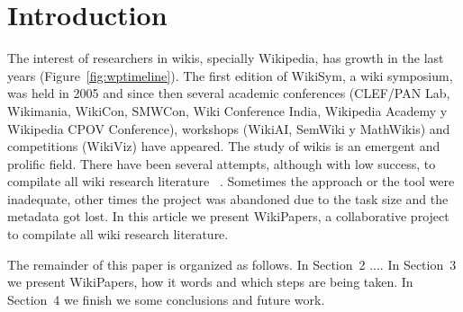 \documentclass[11pt,twocolumn]{article}
\begin{document}
\section{Introduction}

The interest of researchers in wikis, specially Wikipedia, has growth in the last years (Figure~\ref{fig:wptimeline}). The first edition of WikiSym, a wiki symposium, was held in 2005 and since then several academic conferences (CLEF/PAN Lab, Wikimania, WikiCon, SMWCon, Wiki Conference India, Wikipedia Academy y Wikipedia CPOV Conference), workshops (WikiAI, SemWiki y MathWikis) and competitions (WikiViz) have appeared. The study of wikis is an emergent and prolific field. There have been several attempts, although with low success, to compilate all wiki research literature ~\citep{ayers2011}. Sometimes the approach or the tool were inadequate, other times the project was abandoned due to the task size and the metadata got lost. In this article we present WikiPapers, a collaborative project to compilate all wiki research literature.


The remainder of this paper is organized as follows. In Section~2 .... In Section~3 we present WikiPapers, how it words and which steps are being taken. In Section~4 we finish we some conclusions and future work.
\end{document}
